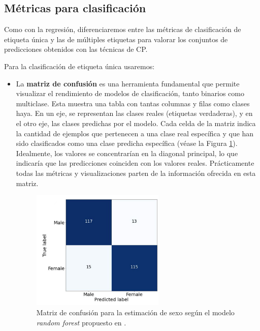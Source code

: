 
\subsection{Métricas para clasificación}

Como con la regresión, diferenciaremos entre las métricas de clasificación de etiqueta única y las de múltiples etiquetas para valorar los conjuntos de predicciones obtenidos con las técnicas de CP.

Para la clasificación de etiqueta única usaremos: 

\begin{itemize}

    \item La \textbf{matriz de confusión} es una herramienta fundamental que permite visualizar el rendimiento de modelos de clasificación, tanto binarios como multiclase. Esta muestra una tabla con tantas columnas y filas como clases haya. En un eje, se representan las clases reales (etiquetas verdaderas), y en el otro eje, las clases predichas por el modelo. Cada celda de la matriz indica la cantidad de ejemplos que pertenecen a una clase real específica y que han sido clasificados como una clase predicha específica (véase la Figura \ref{fig:conf_matrix_binary}). Idealmente, los valores se concentrarían en la diagonal principal, lo que indicaría que las predicciones coinciden con los valores reales. Prácticamente todas las métricas y visualizaciones parten de la información ofrecida en esta matriz. 

    \begin{figure}[h]
        \centering
        \includegraphics[width=0.6\textwidth]{capitulos/cap_02/imagenes/confusion_matrix_binary.png}
        \caption{
            Matriz de confusión para la estimación de sexo según el modelo \textit{random forest} propuesto en \cite{bidmos2023}.
        } 
        \label{fig:conf_matrix_binary}
    \end{figure}


\end{itemize}
